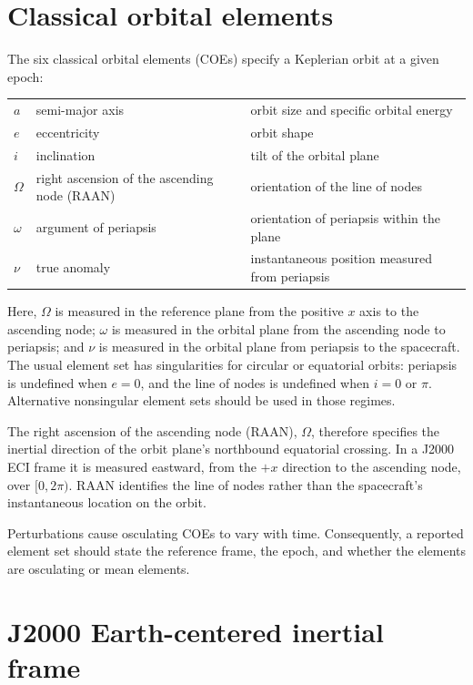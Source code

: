 \documentclass[11pt]{article}
\begin{document}
\section{Classical orbital elements}

The six classical orbital elements (COEs) specify a Keplerian orbit at a given
epoch:
\begin{center}
\begin{tabular}{lll}
  $a$ & semi-major axis & orbit size and specific orbital energy \\
  $e$ & eccentricity & orbit shape \\
  $i$ & inclination & tilt of the orbital plane \\
  $\Omega$ & right ascension of the ascending node (RAAN) & orientation of the line of nodes \\
  $\omega$ & argument of periapsis & orientation of periapsis within the plane \\
  $\nu$ & true anomaly & instantaneous position measured from periapsis
\end{tabular}
\end{center}

Here, $\Omega$ is measured in the reference plane from the positive $x$ axis to
the ascending node; $\omega$ is measured in the orbital plane from the ascending
node to periapsis; and $\nu$ is measured in the orbital plane from periapsis to
the spacecraft. The usual element set has singularities for circular or
equatorial orbits: periapsis is undefined when $e=0$, and the line of nodes is
undefined when $i=0$ or $\pi$. Alternative nonsingular element sets should be
used in those regimes.

The right ascension of the ascending node (RAAN), $\Omega$, therefore specifies
the inertial direction of the orbit plane's northbound equatorial crossing. In a
J2000 ECI frame it is measured eastward, from the $+x$ direction to the
ascending node, over $[0,2\pi)$. RAAN identifies the line of nodes rather than
the spacecraft's instantaneous location on the orbit.

Perturbations cause osculating COEs to vary with time. Consequently, a reported
element set should state the reference frame, the epoch, and whether the elements
are osculating or mean elements.

\section{J2000 Earth-centered inertial frame}
\end{document}
